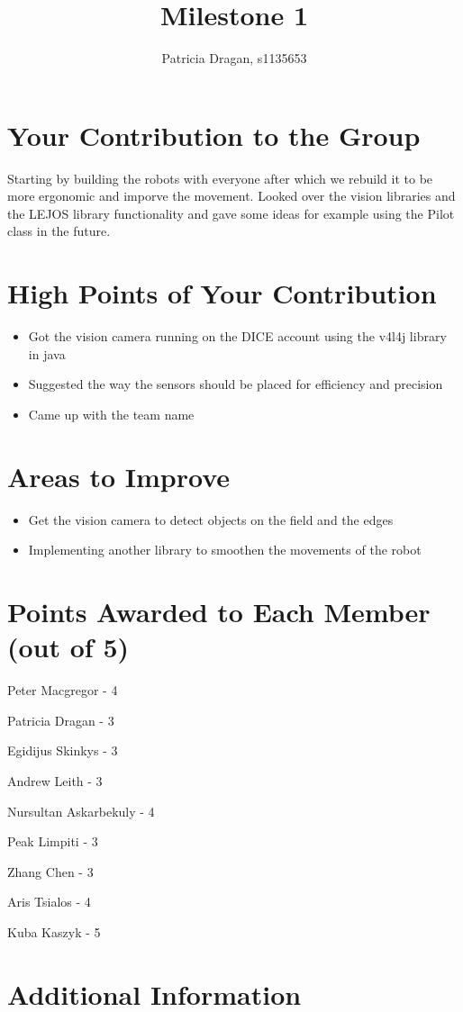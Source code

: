 \documentclass[dvips]{article}
\begin{document}
\sloppy
\title{Milestone 1}
 
\author{Patricia Dragan, s1135653}
 
\maketitle

\section{Your Contribution to the Group}
Starting by building the robots with everyone after which we rebuild it to be more ergonomic and imporve the movement.
Looked over the vision libraries and the LEJOS library functionality and gave some ideas for example using the Pilot class in the future.


\section{High Points of Your Contribution}
\begin{itemize}
  \item Got the vision camera running on the DICE account using the v4l4j library in java
  \item Suggested the way the sensors should be placed for efficiency and precision
  \item Came up with the team name
\end{itemize} 

\section{Areas to Improve}
\begin{itemize}
  \item Get the vision camera to detect objects on the field and the edges
  \item Implementing another library to smoothen the movements of the robot
\end{itemize}


\section{Points Awarded to Each Member (out of 5)}
\begin{itemize}
\begin{multicols}{2}
\item Peter Macgregor - 4
\item Patricia Dragan - 3
\item Egidijus Skinkys - 3
\item Andrew Leith - 3
\item Nursultan Askarbekuly - 4
\item Peak Limpiti - 3
\item Zhang Chen - 3
\item Aris Tsialos - 4 
\item Kuba Kaszyk - 5
\end{multicols}
\end{itemize}

\section{Additional Information}
\end{document}
